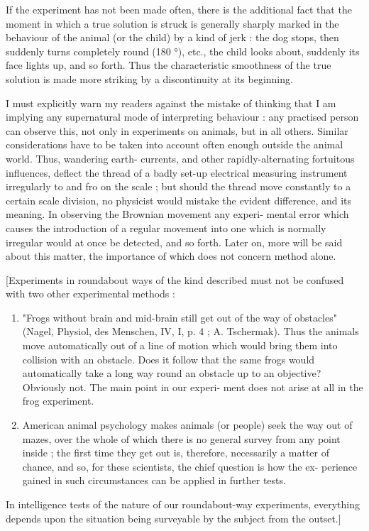 \documentclass{article}
\begin{document}
If the experiment has not been made often, there is the
additional fact that the moment in which a true solution
is struck is generally sharply marked in the behaviour of
the animal (or the child) by a kind of jerk : the dog
stops, then suddenly turns completely round (180 °), etc.,
the child looks about, suddenly its face lights up, and
so forth. Thus the characteristic smoothness of the true
solution is made more striking by a discontinuity at its
beginning.

I must explicitly warn my readers against the mistake
of thinking that I am implying any supernatural mode of
interpreting behaviour : any practised person can observe
this, not only in experiments on animals, but in all others.
Similar considerations have to be taken into account often
enough outside the animal world. Thus, wandering earth-
currents, and other rapidly-alternating fortuitous influences,
deflect the thread of a badly set-up electrical measuring
instrument irregularly to and fro on the scale ; but should
the thread move constantly to a certain scale division, no
physicist would mistake the evident difference, and its
meaning. In observing the Brownian movement any experi-
mental error which causes the introduction of a regular
movement into one which is normally irregular would at once
be detected, and so forth. Later on, more will be said about
this matter, the importance of which does not concern method
alone.

[Experiments in roundabout ways of the kind described
must not be confused with two other experimental methods :
\begin{enumerate}
    \item "Frogs without brain and mid-brain still get out of the
    way of obstacles" (Nagel, Physiol, des Menschen, IV, I, p. 4 ;
    A. Tschermak). Thus the animals move automatically out
    of a line of motion which would bring them into collision
    with an obstacle. Does it follow that the same frogs would
    automatically take a long way round an obstacle up to an
    objective? Obviously not. The main point in our experi-
    ment does not arise at all in the frog experiment.
    \item American
    animal psychology makes animals (or people) seek the way
    out of mazes, over the whole of which there is no general
    survey from any point inside ; the first time they get
    out is, therefore, necessarily a matter of chance, and so,
    for these scientists, the chief question is how the ex-
    perience gained in such circumstances can be applied in
    further tests.
\end{enumerate}
In intelligence tests of the nature of
our roundabout-way experiments, everything depends upon
the situation being surveyable by the subject from the
outset.]
\end{document}
